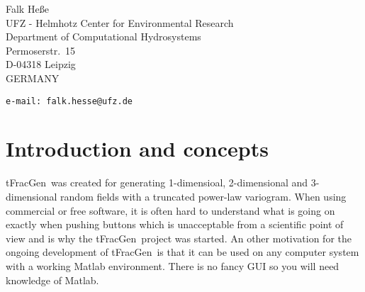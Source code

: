 \documentclass[12pt]{report}
\def\QI{{\sc tFracGen}}
\begin{document}
\vskip10mm

Falk He{\ss}e\\
UFZ - Helmhotz Center for Environmental Research\\
Department of Computational Hydrosystems\\
Permoserstr.~15\\
D-04318 Leipzig\\
GERMANY

{\bigskip\small\par
\tt e-mail: falk.hesse@ufz.de\\
}

\vfill\break

\setcounter{page}{1}\pagestyle{plain}

\chapter{Introduction and concepts}

\QI\ was created for generating 1-dimensioal, 2-dimensional and 3-di\-men\-sio\-nal random fields with a truncated power-law variogram. When using commercial or free software, it is often hard to understand what is going on exactly when pushing buttons which is unacceptable from a scientific point of view and is why the \QI\ project was started. An other motivation for the ongoing development of \QI\ is that it can be used on any computer system with a working Matlab environment. There is no fancy GUI so you will need knowledge of Matlab. 



% 
\end{document}
